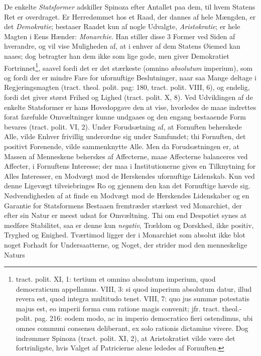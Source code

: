 \documentclass[12pt,a4paper]{book}
\newcommand{\opage}[1]{\marginnote{\footnotesize\textit{[#1]}}}
\begin{document}
De enkelte \emph{Statsformer} adskiller Spinoza efter Antallet paa dem, til hvem Statens Ret er overdraget. Er Herredømmet hos et Raad, der dannes af hele Mængden, er det \emph{Demokratie}; bestaaer Raadet kun af nogle Udvalgte, \emph{Aristokratie}; er hele Magten i Eens Hænder: \emph{Monarchie}. Han stiller disse 3 Former ved Siden af hverandre, og vil vise Muligheden af, at i enhver af dem Statens Øiemed kan naaes; dog betragter han dem ikke som lige
\opage{144} \setcounter{footnote}{0}%
gode, men giver Demokratiet Fortrinnet\footnote{tract. polit. XI, 1: tertium et omnino absolutum imperium, quod democraticum appellamus. VIII, 3: si quod imperium absolutum datur, illud revera est, quod integra multitudo tenet. VIII, 7: quo jus summæ potestatis majus est, eo imperii forma cum ratione magis convenit; jfr. tract. theol.-polit. pag. 216: eodem modo, ac in imperio democratico fieri ostendimus, ubi omnes communi consensu deliberant, ex solo rationis dictamine vivere. Dog indrømmer Spinoza (tract. polit. XI, 2), at Aristokratiet vilde være det fortrinligste, hvis Valget af Patricierne alene lededes af Fornuften.}, saavel fordi det er det stærkeste (omnino \emph{absolutum} imperium), som og fordi der er mindre Fare for ufornuftige Beslutninger, %
naar saa Mange deltage i Regjeringsmagten (tract. theol. polit. pag: 180, tract. polit. VIII, 6), og endelig, fordi det giver størst Frihed og Lighed (tract. polit. X, 8). Ved Udviklingen af de enkelte Statsformer er hans Hovedopgave den at vise, hvorledes de maae indrettes forat farefulde Omvæltninger kunne undgaaes og den engang bestaaende Form bevares (tract. polit. VI, 2). Under Forudsætning af, at Fornuften beherskede Alle, vilde Enhver frivillig underordne sig under Samfundet; thi Fornuften, det positivt Forenende, vilde sammenknytte Alle. Men da Forudsætningen er, at Massen af Menneskene beherskes af Affecterne, maae Affecterne balanceres ved Affecter, i Fornuftens Interesse; der maa i Institutionerne gives en Tilknytning for Alles Interesser, en Modvægt mod de Herskendes ufornuftige Lidenskab. Kun ved denne Ligevægt tilveiebringes Ro og gjennem den kan det Fornuftige hævde sig. Nødvendigheden af at finde en Modvægt mod de Herskendes Lidenskaber og en Garantie for Statsformens Bestaaen fremtræder stærkest ved Monarchiet, der efter sin Natur er meest udsat for Omvæltning. Thi om end Despotiet synes at medføre Stabilitet, saa er denne kun \emph{negativ}, Trældom og Dorskhed, ikke positiv, Tryghed og Enighed. Tværtimod ligger der i Monarchiet som absolut ikke blot noget Forhadt for Undersaatterne, og Noget, der strider mod den menneskelige Naturs
\end{document}
